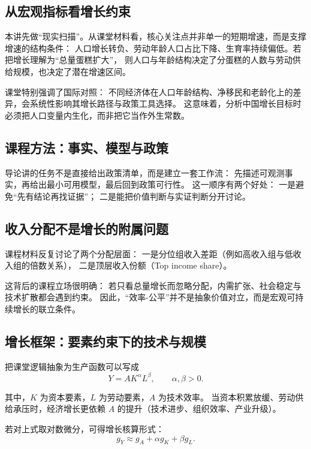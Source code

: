 \documentclass[UTF8,11pt,a4paper]{ctexart}
\begin{document}
\subsection{从宏观指标看增长约束}

本讲先做“现实扫描”。从课堂材料看，核心关注点并非单一的短期增速，而是支撑增速的结构条件：
人口增长转负、劳动年龄人口占比下降、生育率持续偏低。若把增长理解为“总量蛋糕扩大”，
则人口与年龄结构决定了分蛋糕的人数与劳动供给规模，也决定了潜在增速区间。

课堂特别强调了国际对照：
不同经济体在人口年龄结构、净移民和老龄化上的差异，会系统性影响其增长路径与政策工具选择。
这意味着，分析中国增长目标时必须把人口变量内生化，而非把它当作外生常数。

\subsection{课程方法：事实、模型与政策}

导论讲的任务不是直接给出政策清单，而是建立一套工作流：
先描述可观测事实，再给出最小可用模型，最后回到政策可行性。
这一顺序有两个好处：
一是避免“先有结论再找证据”；
二是能把价值判断与实证判断分开讨论。

\subsection{收入分配不是增长的附属问题}

课程材料反复讨论了两个分配层面：
一是分位组收入差距（例如高收入组与低收入组的倍数关系），
二是顶层收入份额（Top income share）。

这背后的课程立场很明确：
若只看总量增长而忽略分配，内需扩张、社会稳定与技术扩散都会遇到约束。
因此，“效率-公平”并不是抽象价值对立，而是宏观可持续增长的联立条件。

\subsection{增长框架：要素约束下的技术与规模}

把课堂逻辑抽象为生产函数可以写成
\begin{equation}
  Y = A K^{\alpha} L^{\beta}, \qquad \alpha,\beta > 0.
\end{equation}

其中，$K$ 为资本要素，$L$ 为劳动要素，$A$ 为技术效率。
当资本积累放缓、劳动供给承压时，经济增长更依赖 $A$ 的提升（技术进步、组织效率、产业升级）。

若对上式取对数微分，可得增长核算形式：
\begin{equation}
  g_Y \approx g_A + \alpha g_K + \beta g_L.
\end{equation}
\end{document}
